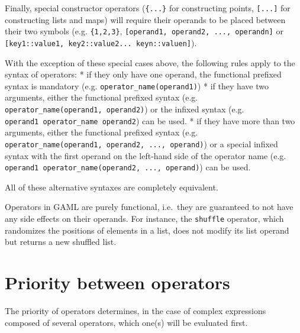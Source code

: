\documentclass[]{book}
\theoremstyle{definition}
\theoremstyle{definition}
\theoremstyle{definition}
\theoremstyle{remark}
\begin{document}
Finally, special constructor operators (\texttt{\{...\}} for
constructing points, \texttt{{[}...{]}} for constructing lists and maps)
will require their operands to be placed between their two symbols (e.g.
\texttt{\{1,2,3\}}, \texttt{{[}operand1,\ operand2,\ ...,\ operandn{]}}
or \texttt{{[}key1::value1,\ key2::value2...\ keyn::valuen{]}}).

With the exception of these special cases above, the following rules
apply to the syntax of operators: * if they only have one operand, the
functional prefixed syntax is mandatory (e.g.
\texttt{operator\_name(operand1)}) * if they have two arguments, either
the functional prefixed syntax (e.g.
\texttt{operator\_name(operand1,\ operand2)}) or the infixed syntax
(e.g. \texttt{operand1\ operator\_name\ operand2}) can be used. * if
they have more than two arguments, either the functional prefixed syntax
(e.g. \texttt{operator\_name(operand1,\ operand2,\ ...,\ operand)}) or a
special infixed syntax with the first operand on the left-hand side of
the operator name (e.g.
\texttt{operand1\ operator\_name(operand2,\ ...,\ operand)}) can be
used.

All of these alternative syntaxes are completely equivalent.

Operators in GAML are purely functional, i.e.~they are guaranteed to not
have any side effects on their operands. For instance, the
\texttt{shuffle} operator, which randomizes the positions of elements in
a list, does not modify its list operand but returns a new shuffled
list.

\section{\texorpdfstring{}{ }}\label{section-20}

\section{Priority between operators}\label{priority-between-operators-2}

The priority of operators determines, in the case of complex expressions
composed of several operators, which one(s) will be evaluated first.
\end{document}
